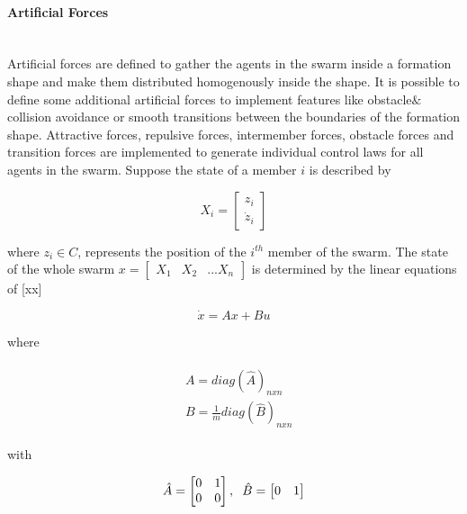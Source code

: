 \paragraph{Artificial Forces}\hspace{0pt} \\ 
Artificial forces are defined to gather the agents in the swarm inside a formation shape and make them distributed homogenously inside the shape. It is possible to define some additional artificial forces to implement features like obstacle$\&$collision avoidance or smooth transitions between the boundaries of the formation shape. Attractive forces, repulsive forces, intermember forces, obstacle forces and transition forces are implemented to generate individual control laws for all agents in the swarm. Suppose the state of a member $i$ is described by

\begin{equation}
X_i = \begin{bmatrix}
z_i\\ \dot{z}_i
\end{bmatrix}
\end{equation}

where  $z_i \in C$, represents the position of the $i^{th}$ member of the swarm. The state of the whole swarm $x= \begin{bmatrix}
X_1 & X_2 & ... X_n
\end{bmatrix}$ is determined by the linear equations of [xx]

\begin{equation}
\dot{x} = Ax + Bu
\end{equation}

where

\begin{align}
\begin{split}
&A = diag\left(\hat{A}\right)_{nxn}\\
&B = \frac{1}{m} diag\left(\hat{B}\right)_{nxn}
\end{split}
\end{align}
			
with

\begin{equation}
\hat{A} = \begin{bmatrix}
0&1\\0&0
\end{bmatrix} , \hspace{0.2cm} \hat{B} = \begin{bmatrix}
0&1
\end{bmatrix}
\end{equation}
			
